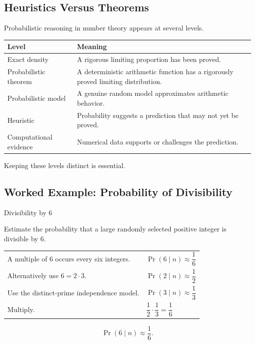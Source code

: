 \subsection{Heuristics Versus Theorems}
\label{subsec:probabilistic-heuristics-versus-theorems}

Probabilistic reasoning in number theory appears at several levels.

\begin{center}
\begin{tabularx}{0.94\textwidth}{@{}p{}X@{}}
\toprule
\textbf{Level} & \textbf{Meaning}\\
\midrule
Exact density & A rigorous limiting proportion has been proved.\\
Probabilistic theorem & A deterministic arithmetic function has a rigorously
proved limiting distribution.\\
Probabilistic model & A genuine random model approximates arithmetic behavior.\\
Heuristic & Probability suggests a prediction that may not yet be proved.\\
Computational evidence & Numerical data supports or challenges the prediction.\\
\bottomrule
\end{tabularx}
\end{center}

Keeping these levels distinct is essential.

\subsection{Worked Example: Probability of Divisibility}
\label{subsec:worked-probability-divisibility}

\begin{workedexamplebox}{Divisibility by \(6\)}

Estimate the probability that a large randomly selected positive integer is
divisible by \(6\).

\begin{tabularx}{\textwidth}{@{}>{\raggedright\arraybackslash}p{}X@{}}
A multiple of \(6\) occurs every six integers. &
\(\Pr(6\mid n)\approx\dfrac16\)\\
Alternatively use \(6=2\cdot3\). &
\(\Pr(2\mid n)\approx\dfrac12\)\\
Use the distinct-prime independence model. &
\(\Pr(3\mid n)\approx\dfrac13\)\\
Multiply. &
\(\dfrac12\cdot\dfrac13=\dfrac16\)
\end{tabularx}

\begin{answerbox}
\[ \boxed{\Pr(6\mid n)\approx\frac16.} \]
\end{answerbox}
\end{workedexamplebox}

